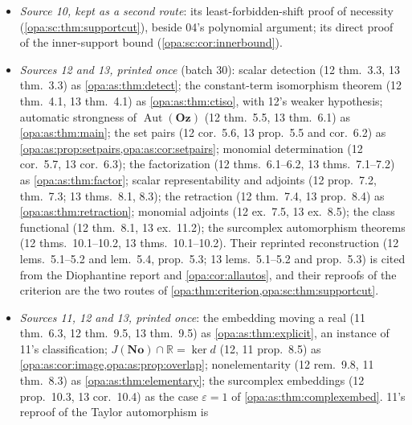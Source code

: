 \documentclass[11pt,oneside]{article}
\numberwithin{equation}{section}
\theoremstyle{definition}
\theoremstyle{remark}
\newcommand{\No}{\mathbf{No}}
\newcommand{\Oz}{\mathbf{Oz}}
\newcommand{\R}{\mathbb R}
\newcommand{\Aut}{\operatorname{Aut}}
\newcommand{\lbl}[1]{\nolinkurl{#1}}
\begin{document}
\begin{itemize}[itemsep=2pt]
\cref{opa:sc:thm:twoterm}); monomials and the omega-map in its nondefinability
theorem as \cref{opa:thm:parameters,opa:cor:puring}; its inner-support bound as a
consequence of \cref{opa:thm:hull}; its Gaussian theorem as
\cref{opa:thm:complex} with the extras of \cref{opa:sc:prop:complex}; its
nonabelian example beside \cref{opa:thm:commutator}; its one-shift lemma as
\cref{opa:lem:shift}; its floor, fraction-field and coefficient-rigidity
statements as \cref{opa:cor:allautos}, \lbl{odg:thm:fractions},
\lbl{odg:def:thm:multiplier} and \lbl{odg:def:thm:autreal}, not reprinted.
\item \emph{Source 10, kept as a second route}: its least-forbidden-shift proof of
necessity (\cref{opa:sc:thm:supportcut}), beside 04's polynomial argument; its
direct proof of the inner-support bound (\cref{opa:sc:cor:innerbound}).
\item \emph{Sources 12 and 13, printed once} (batch 30): scalar detection (12 thm.~3.3,
13 thm.~3.3) as \cref{opa:as:thm:detect}; the constant-term isomorphism theorem (12
thm.~4.1, 13 thm.~4.1) as \cref{opa:as:thm:ctiso}, with 12's weaker hypothesis; automatic
strongness of $\Aut(\Oz)$ (12 thm.~5.5, 13 thm.~6.1) as \cref{opa:as:thm:main}; the set
pairs (12 cor.~5.6, 13 prop.~5.5 and cor.~6.2) as \cref{opa:as:prop:setpairs,opa:as:cor:setpairs};
monomial determination (12 cor.~5.7, 13 cor.~6.3); the factorization (12 thms.~6.1--6.2, 13
thms.~7.1--7.2) as \cref{opa:as:thm:factor}; scalar representability and adjoints (12
prop.~7.2, thm.~7.3; 13 thms.~8.1, 8.3); the retraction (12 thm.~7.4, 13 prop.~8.4) as
\cref{opa:as:thm:retraction}; monomial adjoints (12 ex.~7.5, 13 ex.~8.5); the class functional
(12 thm.~8.1, 13 ex.~11.2); the surcomplex automorphism theorems (12 thms.~10.1--10.2, 13
thms.~10.1--10.2). Their reprinted reconstruction (12 lems.~5.1--5.2 and
lem.~5.4, prop.~5.3; 13 lems.~5.1--5.2 and prop.~5.3) is cited from the Diophantine report and
\cref{opa:cor:allautos}, and their reproofs of the criterion are the two routes of
\cref{opa:thm:criterion,opa:sc:thm:supportcut}.
\item \emph{Sources 11, 12 and 13, printed once}: the embedding moving a real (11 thm.~6.3,
12 thm.~9.5, 13 thm.~9.5) as \cref{opa:as:thm:explicit}, an instance of 11's classification;
$J(\No)\cap\R=\ker d$ (12, 11 prop.~8.5) as \cref{opa:as:cor:image,opa:as:prop:overlap};
nonelementarity (12 rem.~9.8, 11 thm.~8.3) as \cref{opa:as:thm:elementary}; the surcomplex
embeddings (12 prop.~10.3, 13 cor.~10.4) as the case $\varepsilon=1$ of
\cref{opa:as:thm:complexembed}. 11's reproof of the Taylor automorphism is

\end{itemize}
\end{document}
